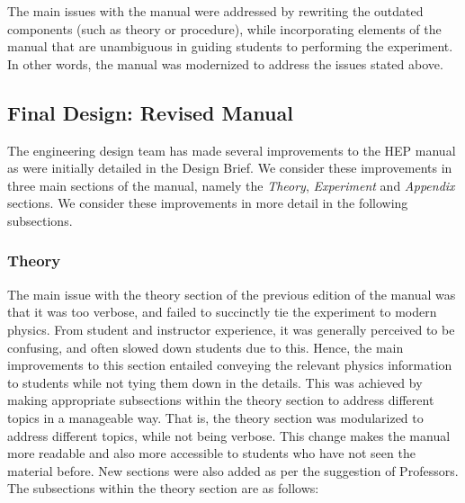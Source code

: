 \documentclass[12pt]{article} %
\begin{document}
The main issues with the manual were addressed by rewriting the outdated components (such as theory or procedure), while incorporating elements of the manual that are unambiguous in guiding students to performing the experiment. In other words, the manual was modernized to address the issues stated above.

\subsection{Final Design: Revised Manual}
The engineering design team has made several improvements to the HEP manual as were initially detailed in the Design Brief. We consider these improvements in three main sections of the manual, namely the \textit{Theory}, \textit{Experiment} and \textit{Appendix} sections. We consider these improvements in more detail in the following subsections. 

\subsubsection{Theory}\label{sec:updated_manual_theory}
The main issue with the theory section of the previous edition of the manual was that it was too verbose, and failed to succinctly tie the experiment to modern physics. From student and instructor experience, it was generally perceived to be confusing, and often slowed down students due to this. Hence, the main improvements to this section entailed conveying the relevant physics information to students while not tying them down in the details. This was achieved by making appropriate subsections within the theory section to address different topics in a manageable way. That is, the theory section was modularized to address different topics, while not being verbose. This change makes the manual more readable and also more accessible to students who have not seen the material before. New sections were also added as per the suggestion of Professors. The subsections within the theory section are as follows:
\end{document}
